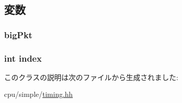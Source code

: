 \subsection{変数}
\hypertarget{classTimingSimpleCPU_1_1SplitFragmentSenderState_a1f11d078171aa3ef13844efa89925ae5}{
\subsubsection[{bigPkt}]{ {\bf bigPkt}}}
\label{classTimingSimpleCPU_1_1SplitFragmentSenderState_a1f11d078171aa3ef13844efa89925ae5}
\hypertarget{classTimingSimpleCPU_1_1SplitFragmentSenderState_a750b5d744c39a06bfb13e6eb010e35d0}{
\subsubsection[{index}]{\setlength{\rightskip}{0pt plus 5cm}int {\bf index}}}
\label{classTimingSimpleCPU_1_1SplitFragmentSenderState_a750b5d744c39a06bfb13e6eb010e35d0}


このクラスの説明は次のファイルから生成されました:\begin{DoxyCompactItemize}
\item 
cpu/simple/\hyperlink{timing_8hh}{timing.hh}\end{DoxyCompactItemize}
